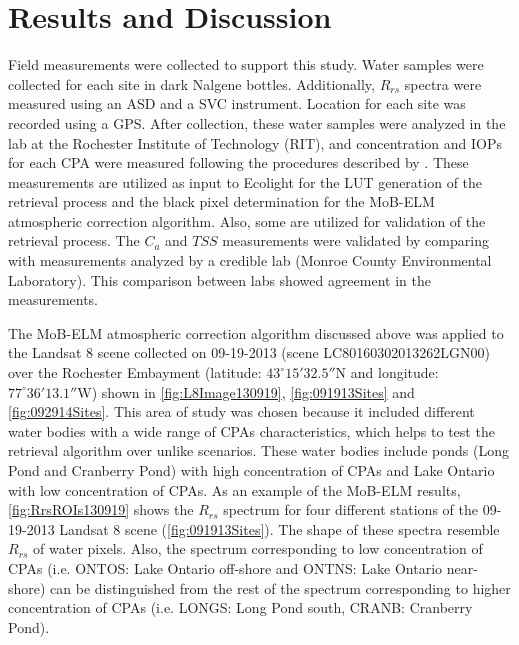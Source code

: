 \documentclass[onecolumn,3p,letterpaper]{elsarticle}
\begin{document}
\section{Results and Discussion}
\label{sec:Results}
Field measurements were collected to support this study. Water samples were collected for each site in dark Nalgene bottles. Additionally, $R_{rs}$ spectra were measured using an ASD and a SVC instrument. Location for each site was recorded using a GPS. After collection, these water samples were analyzed in the lab at the Rochester Institute of Technology (RIT), and concentration and IOPs for each CPA were measured following the procedures described by \cite{Mueller1995}. These measurements are utilized as input to Ecolight for the LUT generation of the retrieval process and the black pixel determination for the MoB-ELM atmospheric correction algorithm. Also, some are utilized for validation of the retrieval process. The $C_a$ and $TSS$ measurements were validated by comparing with measurements analyzed by a credible lab (Monroe County Environmental Laboratory). This comparison between labs showed agreement in the measurements.

The MoB-ELM atmospheric correction algorithm discussed above was applied to the Landsat 8 scene collected on 09-19-2013 (scene LC80160302013262LGN00) over the Rochester Embayment (latitude: $43^\circ15'32.5''$N and longitude: $77^\circ36'13.1''$W) shown in \autoref{fig:L8Image130919}, \autoref{fig:091913Sites} and \autoref{fig:092914Sites}. This area of study was chosen because it included different water bodies with a wide range of CPAs characteristics, which helps to test the retrieval algorithm over unlike scenarios. These water bodies include ponds (Long Pond and Cranberry Pond) with high concentration of CPAs and Lake Ontario with low concentration of CPAs. As an example of the MoB-ELM results, \autoref{fig:RrsROIs130919} shows the $R_{rs}$ spectrum for four different stations of the 09-19-2013 Landsat 8 scene (\autoref{fig:091913Sites}). The shape of these spectra resemble $R_{rs}$ of water pixels. Also, the spectrum corresponding to low concentration of CPAs (i.e. ONTOS: Lake Ontario off-shore and ONTNS: Lake Ontario near-shore) can be distinguished from the rest of the spectrum corresponding to higher concentration of CPAs (i.e. LONGS: Long Pond south, CRANB: Cranberry Pond).
\end{document}
